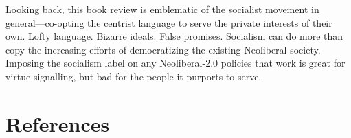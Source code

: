 \documentclass[12pt]{article}
\begin{document}
Looking back, this book review is emblematic of the socialist movement in general---co-opting the centrist language to serve the private interests of their own. Lofty language. Bizarre ideals. False promises. Socialism can do more than copy the increasing efforts of democratizing the existing Neoliberal society. Imposing the socialism label on any Neoliberal-2.0 policies that work is great for virtue signalling, but bad for the people it purports to serve.

\section{References}

\printbibliography[heading=none]

\end{document}
